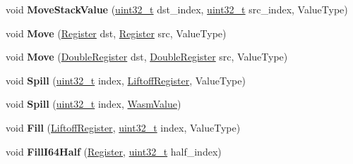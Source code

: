 \begin{DoxyCompactItemize}
void {\bfseries Move\+Stack\+Value} (\mbox{\hyperlink{classuint32__t}{uint32\+\_\+t}} dst\+\_\+index, \mbox{\hyperlink{classuint32__t}{uint32\+\_\+t}} src\+\_\+index, Value\+Type)
\item 
\mbox{\label{classv8_1_1internal_1_1wasm_1_1LiftoffAssembler_a58fe016c4f7cfd3033417226b0660a80}} 
void {\bfseries Move} (\mbox{\hyperlink{classv8_1_1internal_1_1Register}{Register}} dst, \mbox{\hyperlink{classv8_1_1internal_1_1Register}{Register}} src, Value\+Type)
\item 
\mbox{\label{classv8_1_1internal_1_1wasm_1_1LiftoffAssembler_aadc0fe5e7cd554755a156e3024ee779b}} 
void {\bfseries Move} (\mbox{\hyperlink{classv8_1_1internal_1_1DoubleRegister}{Double\+Register}} dst, \mbox{\hyperlink{classv8_1_1internal_1_1DoubleRegister}{Double\+Register}} src, Value\+Type)
\item 
\mbox{\label{classv8_1_1internal_1_1wasm_1_1LiftoffAssembler_a7468b95131bc0e91af520154dc0432ca}} 
void {\bfseries Spill} (\mbox{\hyperlink{classuint32__t}{uint32\+\_\+t}} index, \mbox{\hyperlink{classv8_1_1internal_1_1wasm_1_1LiftoffRegister}{Liftoff\+Register}}, Value\+Type)
\item 
\mbox{\label{classv8_1_1internal_1_1wasm_1_1LiftoffAssembler_af886334e8175cecccf880ab2ee666250}} 
void {\bfseries Spill} (\mbox{\hyperlink{classuint32__t}{uint32\+\_\+t}} index, \mbox{\hyperlink{classv8_1_1internal_1_1wasm_1_1WasmValue}{Wasm\+Value}})
\item 
\mbox{\label{classv8_1_1internal_1_1wasm_1_1LiftoffAssembler_a971a23c1e0bb1ef161d185716f1bf820}} 
void {\bfseries Fill} (\mbox{\hyperlink{classv8_1_1internal_1_1wasm_1_1LiftoffRegister}{Liftoff\+Register}}, \mbox{\hyperlink{classuint32__t}{uint32\+\_\+t}} index, Value\+Type)
\item 
\mbox{\label{classv8_1_1internal_1_1wasm_1_1LiftoffAssembler_a5177e5fe59a89e9a0beb53b8c1e98333}} 
void {\bfseries Fill\+I64\+Half} (\mbox{\hyperlink{classv8_1_1internal_1_1Register}{Register}}, \mbox{\hyperlink{classuint32__t}{uint32\+\_\+t}} half\+\_\+index)

\end{DoxyCompactItemize}
